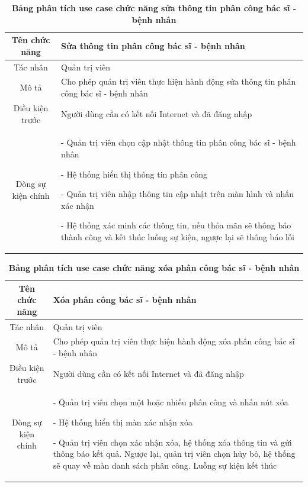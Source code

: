   \begin{table}[H]
    \caption{\bfseries \fontsize{12pt}{0pt}\selectfont Bảng phân tích use case chức năng sửa thông tin phân công bác sĩ - bệnh nhân}
    \centering
    \begin{tabularx}{0.9\textwidth}{|c|X|}
      \hline
      \textbf{Tên chức năng} & \textbf{Sửa thông tin phân công bác sĩ - bệnh nhân} \\
      \hline
      Tác nhân & Quản trị viên \\
      \hline
      Mô tả & Cho phép quản trị viên thực hiện hành động sửa thông tin phân công bác sĩ - bệnh nhân \\
      \hline
      Điều kiện trước & Người dùng cần có kết nối Internet và đã đăng nhập \\
      \hline
      Dòng sự kiện chính & 
        - Quản trị viên chọn cập nhật thông tin phân công bác sĩ - bệnh nhân

        - Hệ thống hiển thị thông tin phân công

        - Quản trị viên nhập thông tin cập nhật trên màn hình và nhấn xác nhận

        - Hệ thống xác minh các thông tin, nếu thỏa mãn sẽ thông báo thành công và kết thúc luồng sự kiện, ngược lại 
        sẽ thông báo lỗi         
        \\
      \hline
    \end{tabularx}
  \end{table}

  \begin{table}[H]
    \caption{\bfseries \fontsize{12pt}{0pt}\selectfont Bảng phân tích use case chức năng xóa phân công bác sĩ - bệnh nhân}
    \centering
    \begin{tabularx}{0.9\textwidth}{|c|X|}
      \hline
      \textbf{Tên chức năng} & \textbf{Xóa phân công bác sĩ - bệnh nhân} \\
      \hline
      Tác nhân & Quản trị viên \\
      \hline
      Mô tả & Cho phép quản trị viên thực hiện hành động xóa phân công bác sĩ - bệnh nhân \\
      \hline
      Điều kiện trước & Người dùng cần có kết nối Internet và đã đăng nhập \\
      \hline
      Dòng sự kiện chính & 
        - Quản trị viên chọn một hoặc nhiều phân công và nhấn nút xóa

        - Hệ thống hiển thị màn xác nhận xóa

        - Quản trị viên chọn xác nhận xóa, hệ thống xóa thông tin và gửi thông báo kết quả. Ngược lại, quản trị viên 
        chọn hủy bỏ, hệ thống sẽ quay về màn danh sách phân công. Luồng sự kiện kết thúc
        \\
      \hline
    \end{tabularx}
  \end{table}

